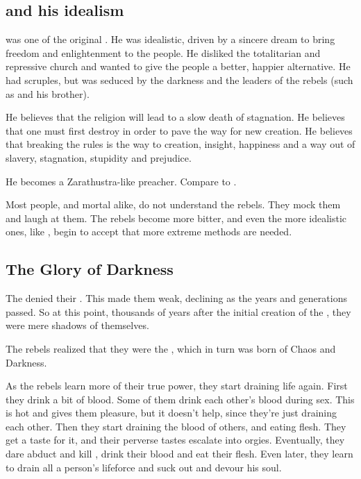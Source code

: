 \subsection[Sithiyacan and his idealism]{\Sithiyacaan{} and his idealism}
\Sithiyacaan{} was one of the original . He was idealistic, driven by a sincere dream to bring freedom and enlightenment to the \resphan{} people. He disliked the totalitarian and repressive \Merkyran{} church and wanted to give the people a better, happier alternative. He had scruples, but was seduced by the darkness and the leaders of the rebels (such as  and his brother). 

He believes that the \Merkyran{} religion will lead to a slow death of stagnation. 
He believes that one must first destroy in order to pave the way for new creation. 
He believes that breaking the rules is the way to creation, insight, happiness and a way out of slavery, stagnation, stupidity and prejudice.

He becomes a Zarathustra-like preacher. Compare to . 

Most people, \resphan{} and mortal alike, do not understand the rebels. They mock them and laugh at them. The rebels become more bitter, and even the more idealistic ones, like \Sithiyacaan, begin to accept that more extreme methods are needed. 









\subsection{The Glory of Darkness}
The \Merkyrans{} denied their . This made them weak, declining as the years and generations passed. So at this point, thousands of years after the initial creation of the \resphain, they were mere shadows of themselves.

The rebels realized that they were the , which in turn was born of Chaos and Darkness. 

As the rebels learn more of their true power, they start draining life again. First they drink a bit of blood. Some of them drink each other's blood during sex. This is hot and gives them pleasure, but it doesn't help, since they're just draining each other. Then they start draining the blood of others, and eating \human{} flesh. They get a taste for it, and their perverse tastes escalate into orgies. Eventually, they dare abduct and kill \resphain{}, drink their blood and eat their flesh. Even later, they learn to drain all a person's lifeforce and suck out and devour his soul. 


